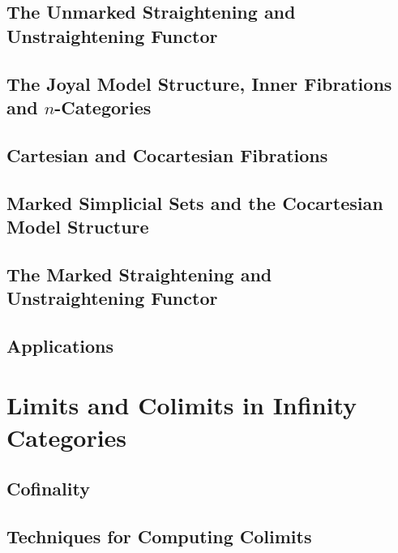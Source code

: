 \documentclass[12pt]{report}
\begin{document}


\subsection{The Unmarked Straightening and Unstraightening Functor}



\subsection{The Joyal Model Structure, Inner Fibrations and \texorpdfstring{$n$}{n}-Categories}



\subsection{Cartesian and Cocartesian Fibrations}



\subsection{Marked Simplicial Sets and the Cocartesian Model Structure}



\subsection{The Marked Straightening and Unstraightening Functor}



\subsection{Applications}



\section{Limits and Colimits in Infinity Categories}

\subsection{Cofinality}



\subsection{Techniques for Computing Colimits}
\end{document}
